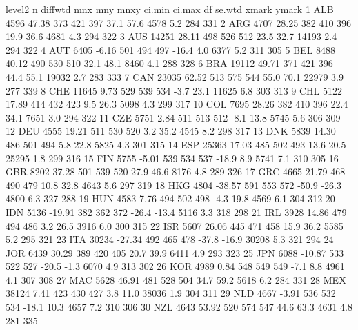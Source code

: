 \documentclass[nojss]{jss}
\begin{document}
\begin{Schunk}
\begin{Soutput}
   level2     n diffwtd mnx mny mnxy ci.min ci.max    df se.wtd xmark ymark
1     ALB  4596   47.38 373 421  397   37.1   57.6  4578    5.2   284   331
2     ARG  4707   28.25 382 410  396   19.9   36.6  4681    4.3   294   322
3     AUS 14251   28.11 498 526  512   23.5   32.7 14193    2.4   294   322
4     AUT  6405   -6.16 501 494  497  -16.4    4.0  6377    5.2   311   305
5     BEL  8488   40.12 490 530  510   32.1   48.1  8460    4.1   288   328
6     BRA 19112   49.71 371 421  396   44.4   55.1 19032    2.7   283   333
7     CAN 23035   62.52 513 575  544   55.0   70.1 22979    3.9   277   339
8     CHE 11645    9.73 529 539  534   -3.7   23.1 11625    6.8   303   313
9     CHL  5122   17.89 414 432  423    9.5   26.3  5098    4.3   299   317
10    COL  7695   28.26 382 410  396   22.4   34.1  7651    3.0   294   322
11    CZE  5751    2.84 511 513  512   -8.1   13.8  5745    5.6   306   309
12    DEU  4555   19.21 511 530  520    3.2   35.2  4545    8.2   298   317
13    DNK  5839   14.30 486 501  494    5.8   22.8  5825    4.3   301   315
14    ESP 25363   17.03 485 502  493   13.6   20.5 25295    1.8   299   316
15    FIN  5755   -5.01 539 534  537  -18.9    8.9  5741    7.1   310   305
16    GBR  8202   37.28 501 539  520   27.9   46.6  8176    4.8   289   326
17    GRC  4665   21.79 468 490  479   10.8   32.8  4643    5.6   297   319
18    HKG  4804  -38.57 591 553  572  -50.9  -26.3  4800    6.3   327   288
19    HUN  4583    7.76 494 502  498   -4.3   19.8  4569    6.1   304   312
20    IDN  5136  -19.91 382 362  372  -26.4  -13.4  5116    3.3   318   298
21    IRL  3928   14.86 479 494  486    3.2   26.5  3916    6.0   300   315
22    ISR  5607   26.06 445 471  458   15.9   36.2  5585    5.2   295   321
23    ITA 30234  -27.34 492 465  478  -37.8  -16.9 30208    5.3   321   294
24    JOR  6439   30.29 389 420  405   20.7   39.9  6411    4.9   293   323
25    JPN  6088  -10.87 533 522  527  -20.5   -1.3  6070    4.9   313   302
26    KOR  4989    0.84 548 549  549   -7.1    8.8  4961    4.1   307   308
27    MAC  5628   46.91 481 528  504   34.7   59.2  5618    6.2   284   331
28    MEX 38124    7.41 423 430  427    3.8   11.0 38036    1.9   304   311
29    NLD  4667   -3.91 536 532  534  -18.1   10.3  4657    7.2   310   306
30    NZL  4643   53.92 520 574  547   44.6   63.3  4631    4.8   281   335

\end{Soutput}
\end{Schunk}
\end{document}
